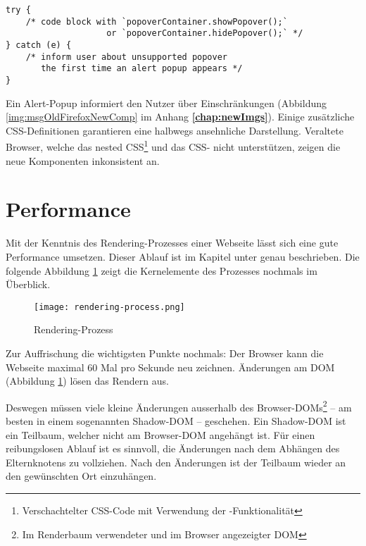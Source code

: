 \begin{lstlisting}[style = htmlcssjs, caption = Workaround für ältere Browser, label = code:popoverWorkaround]
try {
    /* code block with `popoverContainer.showPopover();`
                    or `popoverContainer.hidePopover();` */
} catch (e) {
    /* inform user about unsupported popover 
       the first time an alert popup appears */
}
\end{lstlisting}

Ein Alert-Popup informiert den Nutzer über Einschränkungen (Abbildung \ref{img:msgOldFirefoxNewComp} im Anhang \textbf{\ref{chap:newImgs}}). 
Einige zusätzliche CSS-Definitionen garantieren eine halbwegs ansehnliche Darstellung. 
Veraltete Browser, welche das nested CSS\footnote{
    Verschachtelter CSS-Code mit Verwendung der \codestyle{\&}-Funktionalität
} und das CSS- nicht unterstützen, zeigen die neue Komponenten inkonsistent an. 


\section{Performance}
\label{sec:performance}

Mit der Kenntnis des Rendering-Prozesses einer Webseite lässt sich eine gute Performance umsetzen. 
Dieser Ablauf ist im Kapitel \textbf{} unter \textbf{} genau beschrieben. 
Die folgende Abbildung \ref{img:renderingProcessRecap} zeigt die Kernelemente des Prozesses nochmals im Überblick. 

\begin{figure}[!htb]
    \centering
    \texttt{[image: rendering-process.png]}
    \caption{\centering Rendering-Prozess}
    \label{img:renderingProcessRecap}
\end{figure}

Zur Auffrischung die wichtigsten Punkte nochmals: 
Der Browser kann die Webseite maximal 60 Mal pro Sekunde neu zeichnen. 
Änderungen am DOM (Abbildung \ref{img:renderingProcessRecap}) lösen das Rendern aus. 

Deswegen müssen viele kleine Änderungen ausserhalb des Browser-DOMs\footnote{
    Im Renderbaum verwendeter und im Browser angezeigter DOM
} – am besten in einem sogenannten Shadow-DOM – geschehen. 
Ein Shadow-DOM ist ein Teilbaum, welcher nicht am Browser-DOM angehängt ist. 
Für einen reibungslosen Ablauf ist es sinnvoll, die Änderungen nach dem Abhängen des Elternknotens zu vollziehen. 
Nach den Änderungen ist der Teilbaum wieder an den gewünschten Ort einzuhängen. 

